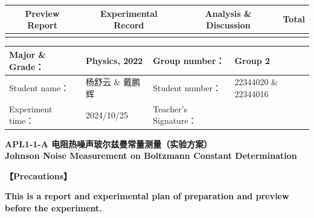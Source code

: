 


\begin{table}
	\renewcommand\arraystretch{1.7}
	\begin{tabularx}{\textwidth}{
			|X|X|X|X
			|X|X|X|X|}
		\hline
		\multicolumn{2}{|c|}{Preview Report}&\multicolumn{2}{|c|}{Experimental Record}&\multicolumn{2}{|c|}{Analysis \& Discussion}&\multicolumn{2}{|c|}{\Large\textbf{Total}}\\
		\hline
		\LARGE & & \LARGE & & \LARGE & & \LARGE & \\
		\hline
	\end{tabularx}
\end{table}


\begin{table}
	\renewcommand\arraystretch{1.7}
	\begin{tabularx}{\textwidth}{|X|X|X|X|}
		\hline
		Major \& Grade： & Physics, 2022 &Group number： & Group 2\\
		\hline
		Student name： & 杨舒云 \& 戴鹏辉 & Student number： & 22344020 \& 22344016 \\
		\hline
		Experiment time： & 2024/10/25 & Teacher's Signature： & \\
		\hline
	\end{tabularx}
\end{table}


\begin{center}
	\huge \textbf{APL1-1-A \quad 电阻热噪声玻尔兹曼常量测量（实验方案）\\Johnson Noise Measurement on Boltzmann Constant Determination}
\end{center}


\textbf{【Precautions】}

\textbf{This is a report and experimental plan of preparation and preview before the experiment.}

